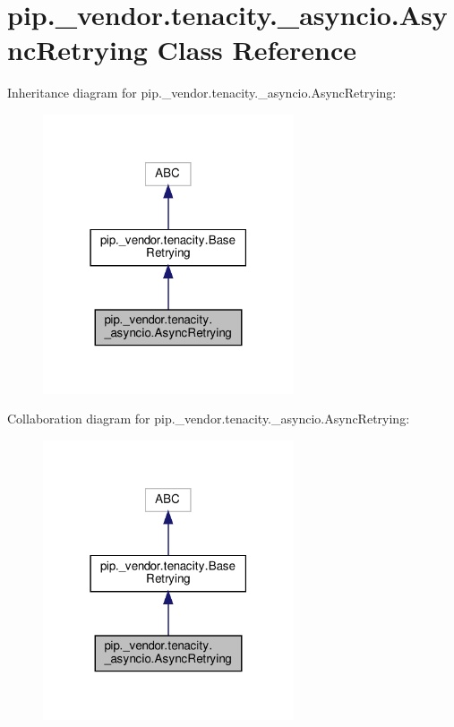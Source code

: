 \hypertarget{classpip_1_1__vendor_1_1tenacity_1_1__asyncio_1_1AsyncRetrying}{}\section{pip.\+\_\+vendor.\+tenacity.\+\_\+asyncio.\+Async\+Retrying Class Reference}
\label{classpip_1_1__vendor_1_1tenacity_1_1__asyncio_1_1AsyncRetrying}


Inheritance diagram for pip.\+\_\+vendor.\+tenacity.\+\_\+asyncio.\+Async\+Retrying\+:
\nopagebreak
\begin{figure}[H]
\begin{center}
\leavevmode
\includegraphics[width=210pt]{classpip_1_1__vendor_1_1tenacity_1_1__asyncio_1_1AsyncRetrying__inherit__graph}
\end{center}
\end{figure}


Collaboration diagram for pip.\+\_\+vendor.\+tenacity.\+\_\+asyncio.\+Async\+Retrying\+:
\nopagebreak
\begin{figure}[H]
\begin{center}
\leavevmode
\includegraphics[width=210pt]{classpip_1_1__vendor_1_1tenacity_1_1__asyncio_1_1AsyncRetrying__coll__graph}
\end{center}
\end{figure}
